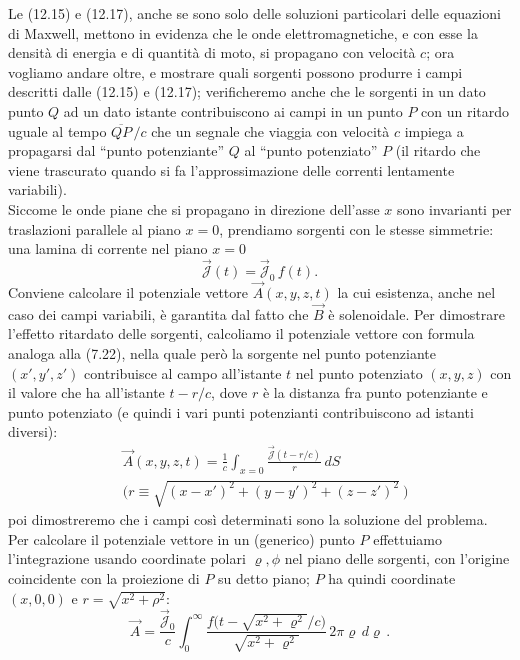 Le (12.15) e (12.17), anche se sono solo delle soluzioni particolari delle
equazioni di Maxwell, mettono in evidenza che le onde elettromagnetiche, e con
esse la densit\`a di energia e di quantit\`a di moto, si propagano con
velocit\`a $c$; ora vogliamo andare oltre, e mostrare quali sorgenti possono
produrre i campi descritti dalle (12.15) e (12.17); verificheremo anche che le
sorgenti in un dato punto $Q$ ad un dato istante contribuiscono ai campi in un
punto $P$ con un ritardo uguale al tempo $\overline{QP}\,/c$ che un segnale che
viaggia con velocit\`a $c$ impiega a propagarsi dal ``punto potenziante'' $Q$ al
``punto potenziato'' $P$ (il ritardo che viene trascurato quando si fa
l'approssimazione delle correnti lentamente variabili).\\
Siccome le onde piane che si propagano in direzione dell'asse $x$ sono
invarianti per traslazioni parallele al piano $x=0$, prendiamo sorgenti con le
stesse simmetrie: una lamina di corrente nel piano $x=0$
\begin{equation}
  \vec{\mathcal J}(t)=\vec{\mathcal J}_0\,f(t).
  \tag{12.19}
\end{equation}
Conviene calcolare il potenziale vettore $\vec A(x,y,z,t)$ la cui esistenza,
anche nel caso dei campi variabili, \`e garantita dal fatto che $\vec B$ \`e
solenoidale. Per dimostrare l'effetto ritardato delle sorgenti, calcoliamo il
potenziale vettore con formula analoga alla (7.22), nella quale per\`o la
sorgente nel punto potenziante $(x',y',z')$ contribuisce al campo all'istante
$t$ nel punto potenziato $(x,y,z)$ con il valore che ha all'istante $t-r/c$,
dove $r$ \`e la distanza fra punto potenziante e punto potenziato (e quindi i
vari punti potenzianti contribuiscono ad istanti diversi):
\begin{equation}
  \begin{aligned}
    &\vec A(x,y,z,t)=\frac{1}{c}
    \int_{x=0}\frac{\vec{\mathcal J}(t-r/c)}{r}\,dS\\
    &\Big(r\equiv\sqrt{(x-x')^2+(y-y')^2+(z-z')^2}\ \Big)
  \end{aligned}
  \tag{12.20}
\end{equation}
poi dimostreremo che i campi cos\`i determinati sono la soluzione del
problema.\\
Per calcolare il potenziale vettore in un (generico) punto $P$ effettuiamo
l'integrazione usando coordinate polari $\varrho,\phi$ nel piano delle sorgenti,
con l'origine coincidente con la proiezione di $P$ su detto piano; $P$ ha quindi
coordinate $(x,0,0)$ e $r=\sqrt{x^2+\rho^2}$:
\begin{equation}
  \vec A=\frac{\vec{\mathcal J}_0}{c}\int_0^\infty
  \frac{f\big(t-\sqrt{x^2+\varrho^2}/c\big)}{\sqrt{x^2+\varrho^2}}
  \,2\pi\varrho\,d\varrho\,.
  \tag{12.21}
\end{equation}
